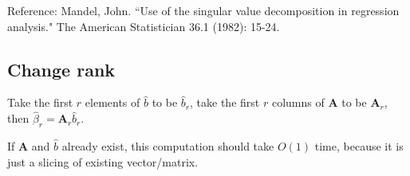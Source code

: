 \documentclass[12pt]{article}
\begin{document}
{\scriptsize Reference: Mandel, John. ``Use of the singular value decomposition in regression analysis." The American Statistician 36.1 (1982): 15-24.}


\subsection{Change rank}
Take the first $r$ elements of $\hat{b}$ to be $\hat{b}_r$,
take the first $r$ columns of $\bm{A}$ to be $\bm{A}_r$, 
then $\hat{\beta}_r = \bm{A}_r \hat{b}_r$.

If $\bm{A}$ and $\hat{b}$ already exist,
this computation should take $O(1)$ time, 
because it is just a slicing of existing vector/matrix.
	

 
 
\end{document}
